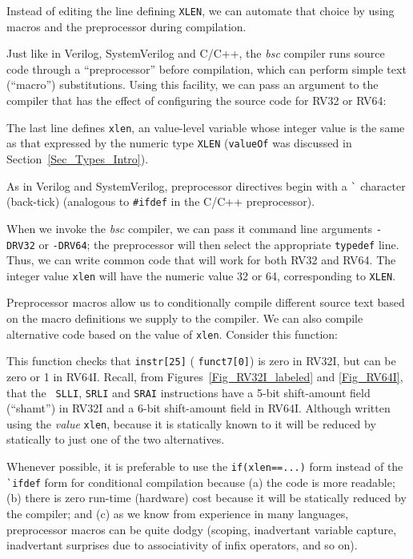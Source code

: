 \label{BSV_Conditional_compilation}


Instead of editing the line defining {\tt XLEN}, we can automate that
choice by using macros and the preprocessor during compilation.

Just like in Verilog, SystemVerilog and C/C++, the \emph{bsc} compiler
runs {\BSV} source code through a ``preprocessor'' before compilation,
which can perform simple text (``macro'') substitutions.  Using this
facility, we can pass an argument to the compiler that has the effect
of configuring the source code for RV32 or RV64:


The last line defines \verb|xlen|, an value-level variable whose
integer value is the same as that expressed by the numeric type
\verb|XLEN| ({\tt valueOf} was discussed in
Section~\ref{Sec_Types_Intro}).

As in Verilog and SystemVerilog, preprocessor directives begin with a
\verb|`| character (back-tick) (analogous to \verb|#ifdef| in the
C/C++ preprocessor).

When we invoke the \emph{bsc} compiler, we can pass it command line
arguments \verb|-DRV32| or \verb|-DRV64|; the preprocessor will then
select the appropriate \verb|typedef| line.  Thus, we can write common
code that will work for both RV32 and RV64.  The integer value
\verb|xlen| will have the numeric value 32 or 64, corresponding to
{\tt XLEN}.

Preprocessor macros allow us to conditionally compile different source
text based on the macro definitions we supply to the compiler.  We can
also compile alternative code based on the value of \verb|xlen|.
Consider this function:


This function checks that \verb|instr[25]| ({\ie} {\tt funct7[0]}) is
zero in RV32I, but can be zero or 1 in RV64I.  Recall, from
Figures~\ref{Fig_RV32I_labeled} and \ref{Fig_RV64I}, that the {\tt
SLLI}, {\tt SRLI} and {\tt SRAI} instructions have a 5-bit
shift-amount field (``shamt'') in RV32I and a 6-bit shift-amount field
in RV64I.  Although written using the \emph{value} {\tt xlen}, because
it is statically known to {\bsc} it will be reduced by {\bsc}
statically to just one of the two alternatives.

Whenever possible, it is preferable to use the \verb|if(xlen==...)|
form instead of the \verb|`ifdef| form for conditional compilation
because (a) the code is more readable; (b) there is zero run-time
(hardware) cost because it will be statically reduced by the compiler;
and (c) as we know from experience in many languages, preprocessor
macros can be quite dodgy (scoping, inadvertant variable capture,
inadvertant surprises due to associativity of infix operators, and so
on).

